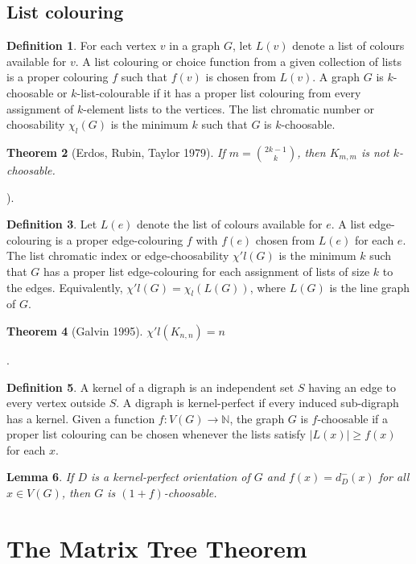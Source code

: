 \documentclass[10pt, fleqn, a4paper, landscape]{article}
\theoremstyle{plain} %
\newtheorem{thm}{Theorem}
\newtheorem{lem}[thm]{Lemma}
\theoremstyle{remark} %
\theoremstyle{definition} %
\newtheorem{defi}[thm]{Definition}
\begin{document}
\begin{multicols}{3}
\begin{tiny}
\subsection{List colouring}

\begin{defi}
For each vertex $v$ in a graph $G$, let $L(v)$ denote a list of colours available for $v$. A list colouring or choice function from a given collection of lists is a proper colouring $f$ such that $f(v)$ is chosen from $L(v)$. A graph $G$ is $k$-choosable or $k$-list-colourable if it has a proper list colouring from every assignment of $k$-element lists to the vertices. The list chromatic number or choosability $\chi_l(G)$ is the minimum $k$ such that $G$ is $k$-choosable.
\end{defi}

\begin{thm}[Erdos, Rubin, Taylor 1979]
If $m = \binom{2k-1}{k}$, then $K_{m,m}$ is not $k$-choosable.
\end{thm}). 

\begin{defi}
Let $L(e)$ denote the list of colours available for $e$. A list edge-colouring is a proper edge-colouring $f$ with $f(e)$ chosen from $L(e)$ for each $e$. The list chromatic index or edge-choosability $\chi' l(G)$ is the minimum $k$ such that $G$ has a proper list edge-colouring for each assignment of lists of size $k$ to the edges. Equivalently, $\chi'
l(G) = \chi_l(L(G))$, where $L(G)$ is the line graph of $G$.
\end{defi}
\addtocounter{thm}{1}
\begin{thm}[Galvin 1995]
$\chi' l(K_{n,n}) = n$
\end{thm}.

\begin{defi}
A kernel of a digraph is an independent set $S$ having an edge to every vertex
outside $S$. A digraph is kernel-perfect if every induced sub-digraph has a kernel. Given a function $f : V (G) \to \mathbb{N}$, the graph $G$ is $f$-choosable if a proper list colouring can be chosen whenever the lists
satisfy $|L(x)|\ge f(x)$ for each $x$.
\end{defi}

\begin{lem}
If $D$ is a kernel-perfect orientation of $G$ and $f(x) = d^-_D(x)$ for all $x \in V (G)$, then $G$ is $(1 + f)$-choosable.
\end{lem}

\section{The Matrix Tree Theorem}


\end{tiny}
\end{multicols}
\end{document}
